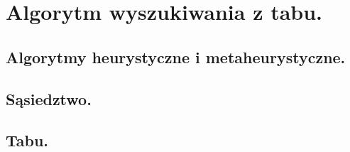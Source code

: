 \chapter{Algorytm wyszukiwania z tabu.}

\section{Algorytmy heurystyczne i metaheurystyczne.}
\section{Sąsiedztwo.}
\section{Tabu.}